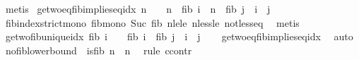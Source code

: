 \begin{isabellebody}
\ metis%
\endisatagproof
{\isafoldproof}%
%
\isadelimproof
\isanewline
%
\endisadelimproof
\isanewline
{}\isamarkupfalse%
\ ge{\isacharunderscore}{\kern0pt}two{\isacharunderscore}{\kern0pt}eq{\isacharunderscore}{\kern0pt}fib{\isacharunderscore}{\kern0pt}implies{\isacharunderscore}{\kern0pt}eq{\isacharunderscore}{\kern0pt}idx{\isacharcolon}{\kern0pt}\ {\isachardoublequoteopen}n\ {\isasymge}\ {}\ {\isasymLongrightarrow}\ n\ {\isacharequal}{\kern0pt}\ fib\ i\ {\isasymLongrightarrow}\ n\ {\isacharequal}{\kern0pt}\ fib\ j\ {\isasymLongrightarrow}\ i\ {\isacharequal}{\kern0pt}\ j{\isachardoublequoteclose}\isanewline
%
\isadelimproof
\ \ %
\endisadelimproof
%
\isatagproof
{}\isamarkupfalse%
\ fib{\isacharunderscore}{\kern0pt}index{\isacharunderscore}{\kern0pt}strict{\isacharunderscore}{\kern0pt}mono\ fib{\isacharunderscore}{\kern0pt}mono\ Suc{\isacharunderscore}{\kern0pt}{}\ fib{\isacharunderscore}{\kern0pt}{}\ nle{\isacharunderscore}{\kern0pt}le\ nless{\isacharunderscore}{\kern0pt}le\ not{\isacharunderscore}{\kern0pt}less{\isacharunderscore}{\kern0pt}eq\ \isamarkupfalse%
\ metis%
\endisatagproof
{\isafoldproof}%
%
\isadelimproof
\isanewline
%
\endisadelimproof
\isanewline
{}\isamarkupfalse%
\ ge{\isacharunderscore}{\kern0pt}two{\isacharunderscore}{\kern0pt}fib{\isacharunderscore}{\kern0pt}unique{\isacharunderscore}{\kern0pt}idx{\isacharcolon}{\kern0pt}\ {\isachardoublequoteopen}fib\ i\ {\isasymge}\ {}\ {\isasymLongrightarrow}\ fib\ i\ {\isacharequal}{\kern0pt}\ fib\ j\ {\isasymLongrightarrow}\ i\ {\isacharequal}{\kern0pt}\ j{\isachardoublequoteclose}\isanewline
%
\isadelimproof
\ \ %
\endisadelimproof
%
\isatagproof
{}\isamarkupfalse%
\ ge{\isacharunderscore}{\kern0pt}two{\isacharunderscore}{\kern0pt}eq{\isacharunderscore}{\kern0pt}fib{\isacharunderscore}{\kern0pt}implies{\isacharunderscore}{\kern0pt}eq{\isacharunderscore}{\kern0pt}idx\ \isamarkupfalse%
\ auto%
\endisatagproof
{\isafoldproof}%
%
\isadelimproof
\isanewline
%
\endisadelimproof
\isanewline
{}\isamarkupfalse%
\ no{\isacharunderscore}{\kern0pt}fib{\isacharunderscore}{\kern0pt}lower{\isacharunderscore}{\kern0pt}bound{\isacharcolon}{\kern0pt}\ {\isachardoublequoteopen}{\isasymnot}\ is{\isacharunderscore}{\kern0pt}fib\ n\ {\isasymLongrightarrow}\ n\ {\isasymge}\ {}{\isachardoublequoteclose}\isanewline
%
\isadelimproof
%
\endisadelimproof
%
\isatagproof
{}\isamarkupfalse%
{\isacharparenleft}{\kern0pt}rule\ ccontr{\isacharparenright}{\kern0pt}\isanewline

\end{isabellebody}
